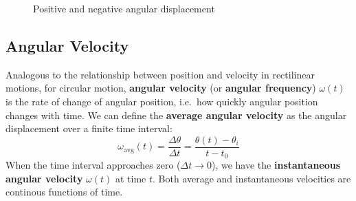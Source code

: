 \begin{figure}[ht]
  \centering
  \caption{Positive and negative angular displacement}
  \label{fig:angular-displacement}
\end{figure}

\subsection{Angular Velocity}
Analogous to the relationship between position and velocity in rectilinear
motions, for circular motion, \textbf{angular velocity} (or
\textbf{angular frequency}) $\omega(t)$ is the rate of change of angular
position, i.e.\ how quickly angular position changes with time. We can define
the \textbf{average angular velocity} as the angular displacement over a
finite time interval:
\begin{equation}
  \boxed{
    \omega_\text{avg}(t)=\frac{\Delta\theta}{\Delta t}
    =\frac{\theta(t)-\theta_i}{t-t_0}
  }
\end{equation}
When the time interval approaches zero ($\Delta t\rightarrow 0$), we have the
\textbf{instantaneous angular velocity} $\omega(t)$ at time $t$. Both average
and instantaneous velocities are continous functions of time.

